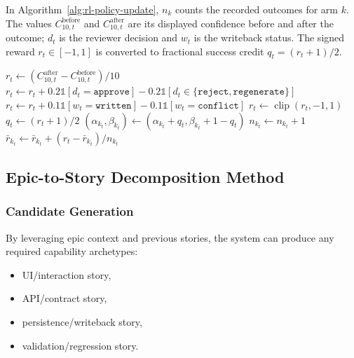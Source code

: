 \documentclass[pdflatex,sn-basic]{sn-jnl}
\begin{document}
In Algorithm~\ref{alg:rl-policy-update}, $n_k$ counts the recorded outcomes for arm $k$. The values $C^{\mathrm{before}}_{10,t}$ and $C^{\mathrm{after}}_{10,t}$ are its displayed confidence before and after the outcome; $d_t$ is the reviewer decision and $w_t$ is the writeback status. The signed reward $r_t\in[-1,1]$ is converted to fractional success credit $q_t=(r_t+1)/2$.

\begin{algorithm}[H]
\DontPrintSemicolon
\footnotesize
\caption{Prompt Policy Update (Bandit + Governance-Aware Reward)}
\label{alg:rl-policy-update}
$r_t \leftarrow (C^{\mathrm{after}}_{10,t}-C^{\mathrm{before}}_{10,t})/10$\;
$r_t \leftarrow r_t+0.2\mathbb{1}[d_t=\texttt{approve}]-0.2\mathbb{1}[d_t\in\{\texttt{reject},\texttt{regenerate}\}]$\;
$r_t \leftarrow r_t+0.1\mathbb{1}[w_t=\texttt{written}]-0.1\mathbb{1}[w_t=\texttt{conflict}]$\;
$r_t \leftarrow \operatorname{clip}(r_t,-1,1)$\;
$q_t \leftarrow (r_t+1)/2$\;
$(\alpha_{k_t},\beta_{k_t}) \leftarrow (\alpha_{k_t}+q_t,\beta_{k_t}+1-q_t)$\;
$n_{k_t} \leftarrow n_{k_t}+1$\;
$\bar r_{k_t} \leftarrow \bar r_{k_t}+(r_t-\bar r_{k_t})/n_{k_t}$\;
\;
\end{algorithm}

\FloatBarrier
\subsection{Epic-to-Story Decomposition Method}


\subsubsection{Candidate Generation}
By leveraging epic context and previous stories, the system can produce any required capability archetypes:
\begin{itemize}
  \item UI/interaction story,
  \item API/contract story,
  \item persistence/writeback story,
  \item validation/regression story.
\end{itemize}
\end{document}
